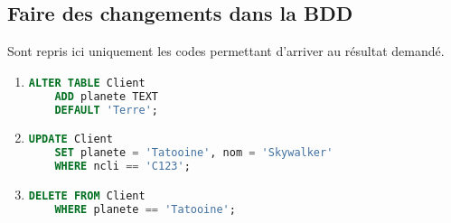 \documentclass{article}
\begin{document}
\subsection{Faire des changements dans la BDD}

    Sont repris ici uniquement les codes permettant d'arriver au résultat demandé.

\begin{enumerate}
    \item
    \begin{lstlisting}[language=SQL]
    ALTER TABLE Client
    ADD planete TEXT
    DEFAULT 'Terre'; \end{lstlisting}

    \item
    \begin{lstlisting}[language=SQL]
    UPDATE Client
    SET planete = 'Tatooine', nom = 'Skywalker'
    WHERE ncli == 'C123'; \end{lstlisting}

    \item
    \begin{lstlisting}[language=SQL]
    DELETE FROM Client
    WHERE planete == 'Tatooine'; \end{lstlisting}
\end{enumerate}
\end{document}
